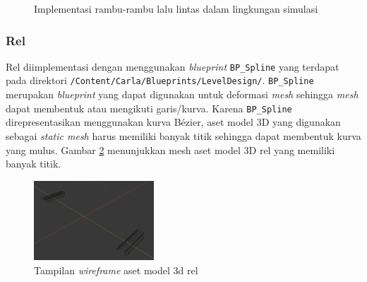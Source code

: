 \begin{figure}[!h]
    \centering
    \hfill
    \caption{Implementasi rambu-rambu lalu lintas dalam lingkungan simulasi}
    \label{fig:road-signs}
\end{figure}

\subsubsection{Rel}

Rel diimplementasi dengan menggunakan \textit{blueprint} \verb|BP_Spline| yang
terdapat pada direktori \verb|/Content/Carla/Blueprints/LevelDesign/|.
\verb|BP_Spline| merupakan \textit{blueprint} yang dapat digunakan untuk
deformasi \textit{mesh} sehingga \textit{mesh} dapat membentuk atau mengikuti
garis/kurva. Karena \verb|BP_Spline| direpresentasikan menggunakan kurva Bézier,
aset model 3D yang digunakan sebagai \textit{static mesh} harus memiliki banyak
titik sehingga dapat membentuk kurva yang mulus. Gambar \ref{fig:rel-mesh}
menunjukkan mesh aset model 3D rel yang memiliki banyak titik.

\begin{figure}[!h]
    \centering
    \includegraphics[width=0.4\textwidth]{resources/chapter-4/rel-mesh.png}
    \caption{Tampilan \textit{wireframe} aset model 3d rel}
    \label{fig:rel-mesh}
\end{figure}

